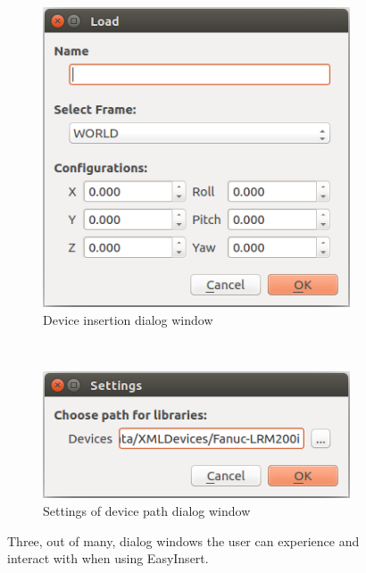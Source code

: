 \begin{figure}[h]
\begin{minipage}[b]{0.45\textwidth}
\begin{subfigure}[b]{\linewidth}
	    \includegraphics[scale=0.7]{Figures/EasyInsertLoadDialog.png}
         \caption{Device insertion dialog window}\label{fig:loadDialog}
       \end{subfigure}\\[\baselineskip]
       \begin{subfigure}[b]{\linewidth}
	    \includegraphics[scale=0.7]{Figures/settingsDialogWindow.png}
         \caption{Settings of device path dialog window}\label{fig:settingsDialog}
       \end{subfigure}
     \end{minipage}
     \caption{Three, out of many, dialog windows the user can experience and interact with when using EasyInsert.}\label{fig:EasyInsertDialogs}
\end{figure}

